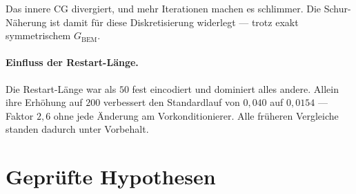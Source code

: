 \documentclass[11pt,a4paper]{article}
\begin{document}
\noindent
Das innere CG divergiert, und mehr Iterationen machen es schlimmer. Die
Schur-Näherung ist damit für diese Diskretisierung widerlegt --- trotz exakt
symmetrischem $G_{\mathrm{BEM}}$.

\paragraph{Einfluss der Restart-Länge.}
Die Restart-Länge war als $50$ fest eincodiert und dominiert alles andere.
Allein ihre Erhöhung auf $200$ verbessert den Standardlauf von $0{,}040$ auf
$0{,}0154$ --- Faktor $2{,}6$ ohne jede Änderung am Vorkonditionierer. Alle
früheren Vergleiche standen dadurch unter Vorbehalt.

\section{Geprüfte Hypothesen}
\end{document}
